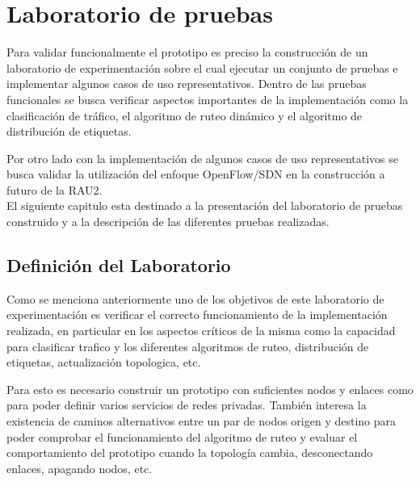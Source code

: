 \chapter{Laboratorio de pruebas}

\ifpdf
    \graphicspath{{Chapter6/Figs/Raster/}{Chapter6/Figs/PDF/}{Chapter6/Figs/}}
\else
    \graphicspath{{Chapter6/Figs/Vector/}{Chapter6/Figs/}}
\fi

Para validar funcionalmente el prototipo es preciso la construcción de un laboratorio de experimentación sobre el cual ejecutar un conjunto de pruebas e implementar algunos casos de uso representativos. Dentro de las pruebas funcionales se busca verificar aspectos importantes de la implementaci\'on como la clasificación de tr\'afico, el algoritmo de ruteo dinámico y el algoritmo de distribución de etiquetas.

Por otro lado con la implementaci\'on de algunos casos de uso representativos se busca validar la utilización del enfoque OpenFlow/SDN en la construcci\'on a futuro de la RAU2.\\

El siguiente capitulo esta destinado a la presentación del laboratorio de pruebas construido y a la descripción de las diferentes pruebas realizadas.

\section{Definición del Laboratorio}

Como se menciona anteriormente uno de los objetivos de este laboratorio de experimentaci\'on es verificar el correcto funcionamiento de la implementaci\'on realizada, en particular en los aspectos críticos de la misma como la capacidad para clasificar trafico y los diferentes algoritmos de ruteo, distribución de etiquetas, actualización topologica, etc. 

Para esto es necesario construir un prototipo con suficientes nodos y enlaces como para poder definir varios servicios de redes privadas. Tambi\'en interesa la existencia de caminos alternativos entre un par de nodos origen y destino para poder comprobar el funcionamiento del algoritmo de ruteo y evaluar el comportamiento del prototipo cuando la topolog\'ia cambia, desconectando enlaces, apagando nodos, etc.\\

